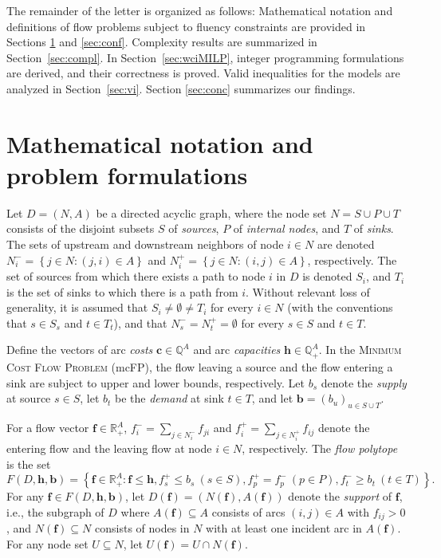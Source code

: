 \documentclass[pdflatex,sn-mathphys-num]{sn-jnl}%
\theoremstyle{thmstyleone}%
\begin{document}
The remainder of the letter is organized as follows:
Mathematical notation and definitions of flow problems subject to fluency constraints are provided in Sections \ref{sec:problem} and \ref{sec:conf}.
Complexity results are summarized in Section~\ref{sec:compl}.
In Section~\ref{sec:wciMILP}, integer programming formulations are derived, and their correctness is proved.
Valid inequalities for the models are analyzed in Section~\ref{sec:vi}. Section \ref{sec:conc} summarizes our findings.

\section{Mathematical notation and problem formulations}\label{sec:problem}

Let $D=(N,A)$ be a directed acyclic graph,
where the node set $N=S\cup P\cup T$ consists of the disjoint subsets $S$ of \emph{sources}, $P$ of \emph{internal nodes}, and $T$ of \emph{sinks}.
The sets of upstream and downstream neighbors of node $i\in N$ are denoted
$N_i^-=\left\{j\in N:(j,i)\in A\right\}$ and $N_i^+=\left\{j\in N:(i,j)\in A\right\}$, respectively.
The set of sources from which there exists a path to node $i$ in $D$ is denoted $S_i$,
and $T_i$ is the set of sinks to which there is a path from $i$.
Without relevant loss of generality, it is assumed that $S_i\neq\emptyset\neq T_i$ for every $i\in N$
(with the conventions that $s\in S_s$ and $t\in T_t$),
and that $N_s^-=N_t^+=\emptyset$ for every $s\in S$ and $t\in T$.

Define the vectors of arc \emph{costs} $\boldsymbol{c}\in\mathbb{Q}^{A}$ and arc \emph{capacities} $\boldsymbol{h}\in\mathbb{Q}_+^{A}$.
In the \textsc{Minimum Cost Flow Problem} (mcFP), the flow leaving a source and the flow entering a sink are subject to upper and lower bounds, respectively.
Let $b_s$ denote the \emph{supply} at source $s\in S$, let $b_t$ be the \emph{demand} at sink $t\in T$,
and let $\boldsymbol{b}=\left(b_u\right)_{u\in S\cup T}$.

For a flow vector $\boldsymbol{f}\in\mathbb{R}_+^A$, $f_i^-=\sum_{j\in N_i^-}f_{ji}$ and $f_i^+=\sum_{j\in N_i^+}f_{ij}$ denote the entering flow and the leaving flow at node $i\in N$, respectively. The \emph{flow polytope} is the set
\[F(D,\boldsymbol{h},\boldsymbol{b}) = \left\{\boldsymbol{f}\in\mathbb{R}_+^A:\boldsymbol{f}\leq\boldsymbol{h}, f_s^+\leq b_s ~(s\in S), f_p^+=f_p^- ~(p\in P), f_t^-\geq b_t ~(t\in T)\right\}.\]
For any $\boldsymbol{f}\in F(D,\boldsymbol{h},\boldsymbol{b})$, let $D(\boldsymbol{f})=\left(N(\boldsymbol{f}), A(\boldsymbol{f})\right)$ denote the
\emph{support} of $\boldsymbol{f}$, i.e., the subgraph of $D$ where $A(\boldsymbol{f})\subseteq A$ consists of arcs $(i,j)\in A$ with $f_{ij}>0$, and $N(\boldsymbol{f})\subseteq N$ consists of nodes in $N$ with at least one incident arc in $A(\boldsymbol{f})$. For any node set $U\subseteq N$, let $U(\boldsymbol{f})=U\cap N(\boldsymbol{f})$.
\end{document}
